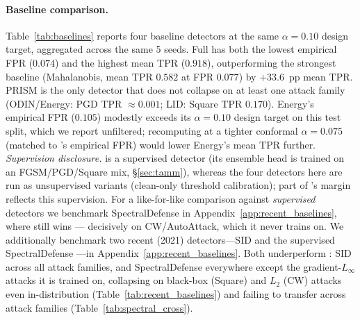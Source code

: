 \begin{table}[h]
\centering
\small

\caption{%
  IID ablation generated from the multi-seed ablation JSON
  (5 seeds, $n=1000$ per seed). C1 is evaluated as the marginal gap between
  Full \prism and Ensemble-no-TDA (mean TPR $0.918 - 0.787 = +13.1$~pp).
  Each channel-mask arm exposes a distinct failure mode:
  No-LogitProfile FPR explodes to 0.938 (the logit channel is the
  FPR-controller); No-StabilityV2 PGD collapses to 0.396 (stability is the
  PGD signal); No-GradNorm FPR triples to 0.218 (gradient norm is a
  counter-evidence channel); No-DCT FGSM drops to 0.751 (DCT is the FGSM
  signal). All channel arms reach $p<0.001$ on at least one attack.
  \textbf{Reading guide (matching Table~\ref{tab:c100_abl}).} Rows whose
  mean FPR exceeds the $0.10$ design target --- No-LogitProfile ($0.938$),
  No-GradNorm ($0.218$), and No-StabilityV2 ($0.107$) --- are threshold
  collapses, not improved detection: their higher mean TPR is bought by
  flagging far more clean inputs and is non-deployable. Only Full \prism
  ($0.074$), No-DCT ($0.098$), and Ensemble-no-TDA ($0.077$) sit at the
  design FPR, so only their TPRs are comparable to Full \prism.
}
\label{tab:ablation}
\end{table}

\paragraph{Baseline comparison.}
Table~\ref{tab:baselines} reports four baseline detectors at the same
$\alpha{=}0.10$ design target, aggregated across the same 5 seeds. \prism
Full has both the lowest empirical FPR ($0.074$) and the highest mean TPR
($0.918$), outperforming the strongest baseline (Mahalanobis, mean TPR
$0.582$ at FPR $0.077$) by $+33.6$~pp mean TPR. PRISM is the only
detector that does not collapse on at least one attack family
(ODIN/Energy: PGD TPR $\approx 0.001$; LID: Square TPR $0.170$).
Energy's empirical FPR ($0.105$) modestly exceeds its $\alpha{=}0.10$
design target on this test split, which we report unfiltered; recomputing
at a tighter conformal $\alpha{=}0.075$ (matched to \prism's empirical
FPR) would lower Energy's mean TPR further.
\emph{Supervision disclosure.} \prism is a supervised detector (its ensemble
head is trained on an FGSM/PGD/Square mix, \S\ref{sec:tamm}), whereas the four
detectors here are run as unsupervised variants (clean-only threshold
calibration); part of \prism's margin reflects this supervision. For a
like-for-like comparison against \emph{supervised} detectors we benchmark
SpectralDefense in Appendix~\ref{app:recent_baselines}, where \prism still wins
--- decisively on CW/AutoAttack, which it never trains on.
We additionally benchmark two recent (2021) detectors---SID
\cite{tian2021detecting} and the supervised SpectralDefense
\cite{harder2021spectraldefense}---in Appendix~\ref{app:recent_baselines}.
Both underperform \prism: SID across all attack families, and
SpectralDefense everywhere except the gradient-$L_\infty$ attacks it is
trained on, collapsing on black-box (Square) and $L_2$ (CW) attacks even
in-distribution (Table~\ref{tab:recent_baselines}) and failing to transfer
across attack families (Table~\ref{tab:spectral_cross}).

